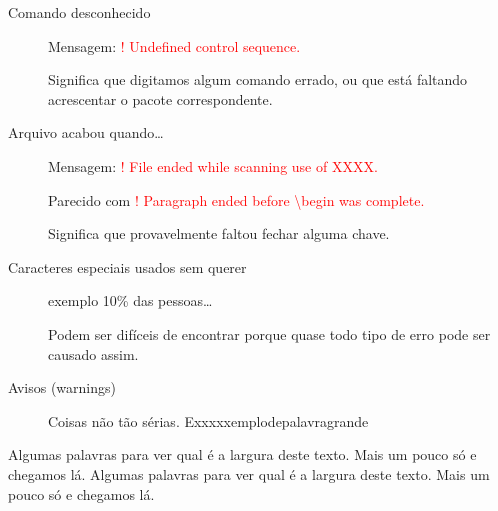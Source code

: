\documentclass[14pt,a5paper]{memoir}
\newcommand{\msgerr}[1]{\textcolor{red}{#1}}
\begin{document}
\begin{description}

\item[Comando desconhecido]

   Mensagem: \msgerr{! Undefined control sequence.}

   Significa que digitamos algum comando errado,
   ou que está faltando acrescentar o pacote
   correspondente.

\item[Arquivo acabou quando\ldots]

   Mensagem: \msgerr{! File ended 
   while scanning use of XXXX.}
   
   Parecido com \msgerr{! Paragraph ended before \textbackslash begin was complete.}
   
   Significa que provavelmente faltou fechar
   alguma chave.
   
\item[Caracteres especiais usados sem querer]

	exemplo 10\% das pessoas\ldots
	
	Podem ser difíceis de encontrar porque quase todo tipo de erro pode ser causado assim.
	
\item[Avisos (warnings)]

   Coisas não tão sérias. E\-xxxxxemplodepalavragrande
\end{description}

Algumas palavras para ver qual é a largura deste texto. Mais um pouco só e chegamos lá. Algumas palavras para ver qual é a largura deste texto. Mais um pouco só e chegamos lá.
\end{document}
